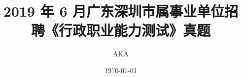 \documentclass[aspectratio=169]{beamer}
\begin{document}
%
%

\title{2019 年 6 月广东深圳市属事业单位招聘《行政职业能力测试》真题}
\author{AKA}
\date{\today}

\begin{frame}
\titlepage
\end{frame}

\end{document}
